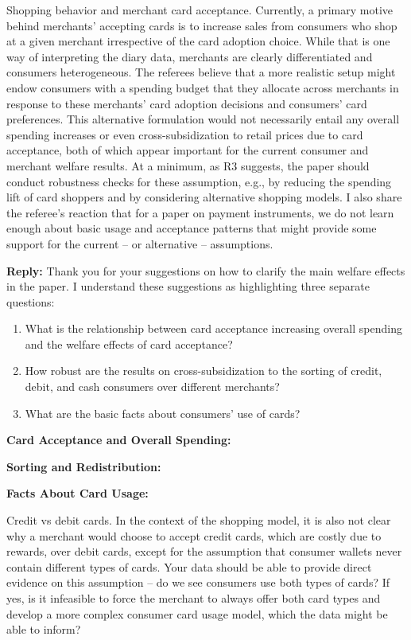 \documentclass[main.tex]{subfiles}
\begin{document}
\begin{refsection}
\begin{refcommentnoclear}
    Shopping behavior and merchant card acceptance.
Currently, a primary motive
    behind merchants' accepting cards is to increase sales from consumers who shop
    at a given merchant irrespective of the card adoption choice.
While that is one
    way of interpreting the diary data, merchants are clearly differentiated and
    consumers heterogeneous.
The referees believe that a more realistic setup might
    endow consumers with a spending budget that they allocate across merchants in
    response to these merchants' card adoption decisions and consumers' card
    preferences.
This alternative formulation would not necessarily entail any overall
    spending increases or even cross-subsidization to retail prices due to card
    acceptance, both of which appear important for the current consumer and
    merchant welfare results.
At a minimum, as R3 suggests, the paper should
    conduct robustness checks for these assumption, e.g., by reducing the spending
    lift of card shoppers and by considering alternative shopping models.
I also share
    the referee's reaction that for a paper on payment instruments, we do not learn
    enough about basic usage and acceptance patterns that might provide some
    support for the current -- or alternative -- assumptions.
\end{refcommentnoclear}

\textbf{Reply: } Thank you for your suggestions on how to clarify the main welfare effects in the paper.
I understand these suggestions as highlighting three separate questions:

\begin{enumerate}
    \item What is the relationship between card acceptance increasing overall spending and the welfare effects of card acceptance?
    \item How robust are the results on cross-subsidization to the sorting of credit, debit, and cash consumers over different merchants?
    \item What are the basic facts about consumers' use of cards?
\end{enumerate}

\textbf{Card Acceptance and Overall Spending: } \replyoverallspend

\textbf{Sorting and Redistribution: } \replysorting

\textbf{Facts About Card Usage: } \replyfacts

\begin{refcommentnoclear}
    Credit vs debit cards.
In the context of the shopping model, it is also not clear why a merchant would choose to accept credit cards, which are costly due to rewards, over debit cards, except for the assumption that consumer wallets never contain different types of cards.
Your data should be able to provide direct evidence on this assumption -- do we see consumers use both types of cards?
If yes, is it infeasible to force the merchant to always offer both card types and develop a more complex consumer card usage model, which the data might be able to inform?
\end{refcommentnoclear}


\end{refsection}
\end{document}
